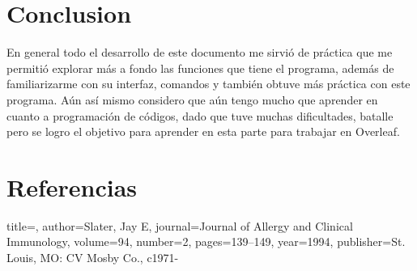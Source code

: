 \documentclass{article}
\begin{document}
\section{Conclusion}

En general todo el desarrollo de este documento me sirvió de práctica que me permitió explorar más a fondo las funciones que tiene el programa, además de familiarizarme con su interfaz, comandos y también obtuve más práctica con este programa. Aún así mismo considero que aún tengo mucho que aprender en cuanto a programación de códigos, dado que tuve muchas dificultades, batalle pero se logro el objetivo para aprender en esta parte para trabajar en Overleaf.

\section{Referencias}
\cite
{Latex allergy}
  title={},
  author={Slater, Jay E},
  journal={Journal of Allergy and Clinical Immunology},
  volume={94},
  number={2},
  pages={139--149},
  year={1994},
  publisher={St. Louis, MO: CV Mosby Co., c1971-}





\end{document}

